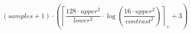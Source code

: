 \[\left(samples + 1\right) \cdot \left(\left\lceil \frac{128 \cdot upper^{2}}{lower^{2}} \cdot \log\left(\frac{16 \cdot upper^{2}}{contrast^{2}}\right) \right\rceil_{+} + 3\right)\]
